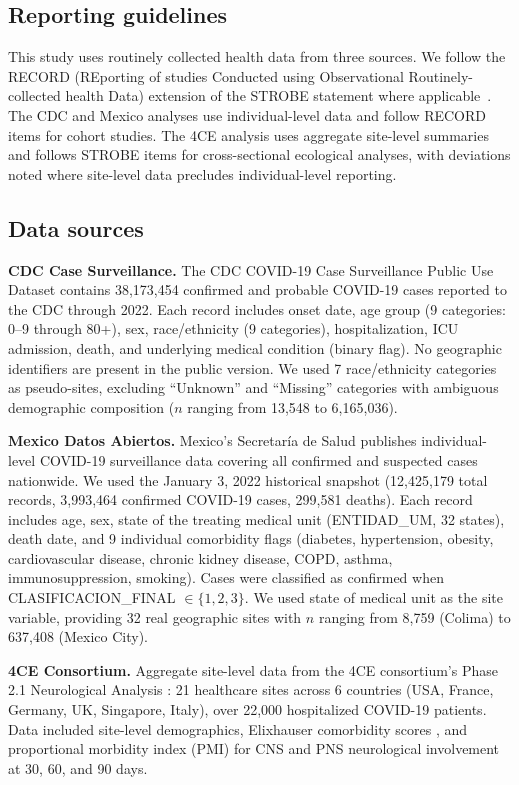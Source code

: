 \documentclass[11pt]{article}
\begin{document}
\subsection{Reporting guidelines}

This study uses routinely collected health data from three sources.
We follow the RECORD (REporting of studies Conducted using
Observational Routinely-collected health Data) extension of the
STROBE statement where applicable~\cite{benchimol2015record}.
The CDC and Mexico analyses use individual-level data and follow
RECORD items for cohort studies.  The 4CE analysis uses aggregate
site-level summaries and follows STROBE items for cross-sectional
ecological analyses, with deviations noted where site-level data
precludes individual-level reporting.

\subsection{Data sources}

\textbf{CDC Case Surveillance.}  The CDC COVID-19 Case Surveillance Public
Use Dataset contains 38,173,454 confirmed and probable COVID-19 cases reported
to the CDC through 2022.  Each record includes onset date, age group (9
categories: 0--9 through 80+), sex, race/ethnicity (9 categories),
hospitalization, ICU admission, death, and underlying medical condition (binary
flag).  No geographic identifiers are present in the public version.  We used
7 race/ethnicity categories as pseudo-sites, excluding ``Unknown'' and
``Missing'' categories with ambiguous demographic composition ($n$ ranging
from 13,548 to 6,165,036).

\textbf{Mexico Datos Abiertos.}  Mexico's Secretar\'{i}a de Salud publishes
individual-level COVID-19 surveillance data covering all confirmed and
suspected cases nationwide.  We used the January 3, 2022 historical snapshot
(12,425,179 total records, 3,993,464 confirmed COVID-19 cases, 299,581
deaths).  Each record includes age, sex, state of the treating medical unit
(ENTIDAD\_UM, 32 states), death date, and 9 individual comorbidity flags
(diabetes, hypertension, obesity, cardiovascular disease, chronic kidney
disease, COPD, asthma, immunosuppression, smoking).  Cases were classified as
confirmed when CLASIFICACION\_FINAL $\in \{1, 2, 3\}$.  We used state of
medical unit as the site variable, providing 32 real geographic sites with
$n$ ranging from 8,759 (Colima) to 637,408 (Mexico City).

\textbf{4CE Consortium.}  Aggregate site-level data from the 4CE consortium's
Phase 2.1 Neurological Analysis \cite{four_ce_neuro2021}: 21 healthcare sites
across 6 countries (USA, France, Germany, UK, Singapore, Italy), over 22,000
hospitalized COVID-19 patients.  Data included site-level demographics,
Elixhauser comorbidity scores \cite{elixhauser1998}, and proportional morbidity
index (PMI) for CNS and PNS neurological involvement at 30, 60, and 90 days.
\end{document}
